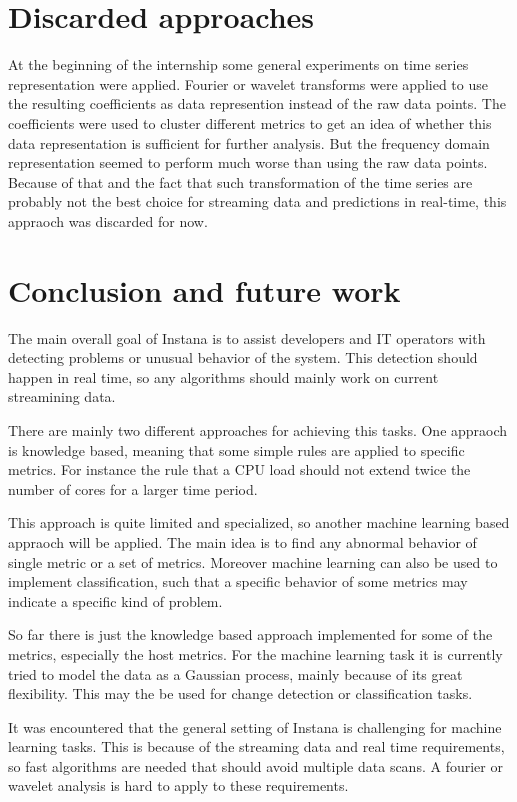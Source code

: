 \documentclass[]{article}
\begin{document}
\section{Discarded  approaches}
At the beginning of the internship some general experiments on time series representation were applied.
Fourier or wavelet transforms were applied to use the resulting coefficients as data represention instead of the raw data points.
The coefficients were used to cluster different metrics to get an idea of whether this data representation is sufficient for further analysis.
But the frequency domain representation seemed to perform much worse than using the raw data points.
Because of that and the fact that such transformation of the time series are probably not the best choice for streaming data and predictions in real-time, this appraoch was discarded for now.

\section{Conclusion and future work}
The main overall goal of Instana is to assist developers and IT operators with detecting problems or unusual behavior of the system.
This detection should happen in real time, so any algorithms should mainly work on current streamining data.

There are mainly two different approaches for achieving this tasks.
One appraoch is knowledge based, meaning that some simple rules are applied to specific metrics.
For instance the rule that a CPU load should not extend twice the number of cores for a larger time period.

This approach is quite limited and specialized, so another machine learning based appraoch will be applied.
The main idea is to find any abnormal behavior of single metric or a set of metrics.
Moreover machine learning can also be used to implement classification, such that a specific behavior of some metrics may indicate a specific kind of problem.

So far there is just the knowledge based approach implemented for some of the metrics, especially the host metrics.
For the machine learning task it is currently tried to model the data as a Gaussian process, mainly because of its great flexibility.
This may the be used for change detection or classification tasks.

It was encountered that the general setting of Instana is challenging for machine learning tasks.
This is because of the streaming data and real time requirements, so fast algorithms are needed that should avoid multiple data scans.
A fourier or wavelet analysis is hard to apply to these requirements.

\printbibliography
\end{document}
